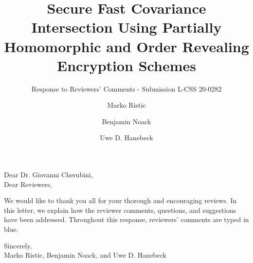 \documentclass[a4paper]{scrartcl}
\title{\boldmath Secure Fast Covariance Intersection Using Partially Homomorphic and Order Revealing Encryption Schemes}
\subtitle{Response to Reviewers' Comments - Submission L-CSS 20-0282}
\author{Marko Ristic\and Benjamin Noack\and Uwe D. Hanebeck}
\newcommand{\reviewtext}[1]{{\color{nblue} #1}}
\begin{document}
\maketitle

Dear Dr. Giovanni Cherubini,\\
Dear Reviewers,

We would like to thank you all for your thorough and encouraging reviews. In this letter, we explain how the reviewer comments, questions, and suggestions have been addressed. Throughout this response, reviewers' comments are typed in \reviewtext{blue}. 

Sincerely,\\
Marko Ristic, Benjamin Noack, and Uwe D. Hanebeck

\end{document}
